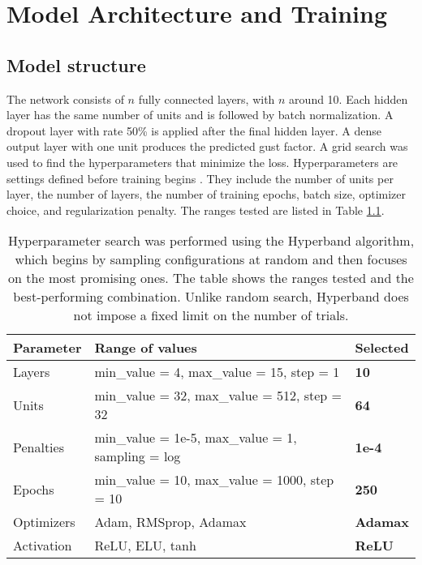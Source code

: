 
\chapter{Model Architecture and Training}

\label{Chapter3}

\section{Model structure}
The network consists of \(n\) fully connected layers, with \(n\) around 10. Each hidden layer has the same number of units and is followed by batch normalization. A dropout layer with rate 50\% is applied after the final hidden layer. A dense output layer with one unit produces the predicted gust factor. A grid search was used to find the hyperparameters that minimize the loss. Hyperparameters are settings defined before training begins \cite{hyperparameters_definition}. They include the number of units per layer, the number of layers, the number of training epochs, batch size, optimizer choice, and regularization penalty. The ranges tested are listed in Table \ref{table:gridSearchHyperparamters}.


\begin{table}[h]
    \centering
    \caption[Hyperparameter search with Hyperband]{Hyperparameter search was performed using the Hyperband algorithm, which begins by sampling configurations at random and then focuses on the most promising ones. The table shows the ranges tested and the best-performing combination. Unlike random search, Hyperband does not impose a fixed limit on the number of trials.}
    \label{table:gridSearchHyperparamters}
    \begin{tabular}{lll}
        \toprule
        Parameter & Range of values & Selected\\
        \midrule
        Layers &  min\_value = 4, max\_value = 15, step = 1 & \textbf{10}\\
        Units &  min\_value = 32, max\_value = 512, step = 32 & \textbf{64}\\
        Penalties & min\_value = 1e-5, max\_value = 1, sampling = log & \textbf{1e-4}\\
        Epochs & min\_value = 10, max\_value = 1000, step = 10 & \textbf{250}\\
        Optimizers & Adam, RMSprop, Adamax & \textbf{Adamax}\\
        Activation & ReLU, ELU, tanh & \textbf{ReLU}\\
        \bottomrule
    \end{tabular}
\end{table}

